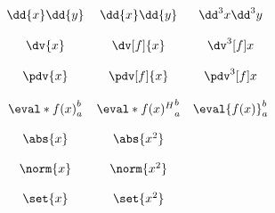 \documentclass{unittest}
\begin{document}
\(\begin{array}{ccccc}
\\\\%
	\dd{x}\dd{y} & \dd{x}\dd{y} &\dd^3{x}\dd^3{y}
\\\\%
	\dv{x} & \dv[f]{x} &\dv^3[f]{x}
\\\\%
	\pdv{x} & \pdv[f]{x} & \pdv^3[f]{x}
\\\\%
	\eval*{f(x)}_a^b & \eval*{f(x)^H}_a^b & \eval{f(x)}_a^b
\\\\%
	\abs{x} & \abs{x^2} &
\\\\%
	\norm{x} & \norm{x^2} &
\\\\%
	\set{x} & \set{x^2} &
\\\\%
\end{array}\)
\end{document}
